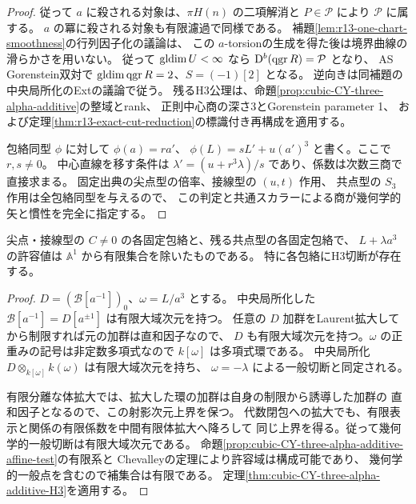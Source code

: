 \begin{proof}
従って $a$ に殺される対象は、$\pi H(n)$ の二項解消と
$P\in\mathcal P$ により $\mathcal P$ に属する。
$a$ の冪に殺される対象も有限濾過で同様である。
補題\ref{lem:r13-one-chart-smoothness}の行列因子化の議論は、
この $a$-torsionの生成を得た後は境界曲線の滑らかさを用いない。
従って $\operatorname{gldim} U<\infty$ なら $\mathrm D^b(\operatorname{qgr} R)=\mathcal P$ となり、
AS Gorenstein双対で $\operatorname{gldim}\operatorname{qgr} R=2$、$S=(-1)[2]$ となる。
逆向きは同補題の中央局所化のExtの議論で従う。
残るH3公理は、命題\ref{prop:cubic-CY-three-alpha-additive}の整域とrank、
正則中心商の深さ3とGorenstein parameter 1、
および定理\ref{thm:r13-exact-cut-reduction}の標識付き再構成を適用する。

包絡同型 $\phi$ に対して $\phi(a)=r a'$、
$\phi(L)=sL'+u(a')^3$ と書く。ここで $r,s\ne0$。
中心直線を移す条件は
$\lambda'=(u+r^3\lambda)/s$ であり、係数は次数三商で直接求まる。
固定出典の尖点型の倍率、接線型の $(u,t)$ 作用、
共点型の $S_3$ 作用は全包絡同型を与えるので、
この判定と共通スカラーによる商が幾何学的矢と慣性を完全に指定する。
\end{proof}

\begin{corollary}\label{cor:cubic-CY-three-alpha-additive-finite-exception}
尖点・接線型の $C\ne0$ の各固定包絡と、残る共点型の各固定包絡で、
$L+\lambda a^3$ の許容値は $\mathbb A^1$ から有限集合を除いたものである。
特に各包絡にH3切断が存在する。
\end{corollary}
\begin{proof}
$D=(\mathcal B[a^{-1}])_0$、$\omega=L/a^3$ とする。
中央局所化した $\mathcal B[a^{-1}]=D[a^{\pm1}]$ は有限大域次元を持つ。
任意の $D$ 加群をLaurent拡大してから制限すれば元の加群は直和因子なので、
$D$ も有限大域次元を持つ。$\omega$ の正重みの記号は非定数多項式なので
$k[\omega]$ は多項式環である。
中央局所化 $D\otimes_{k[\omega]}k(\omega)$ は有限大域次元を持ち、
$\omega=-\lambda$ による一般切断と同定される。

有限分離な体拡大では、拡大した環の加群は自身の制限から誘導した加群の
直和因子となるので、この射影次元上界を保つ。
代数閉包への拡大でも、有限表示と関係の有限係数を中間有限体拡大へ降ろして
同じ上界を得る。従って幾何学的一般切断は有限大域次元である。
命題\ref{prop:cubic-CY-three-alpha-additive-affine-test}の有限系と
Chevalleyの定理により許容域は構成可能であり、
幾何学的一般点を含むので補集合は有限である。
定理\ref{thm:cubic-CY-three-alpha-additive-H3}を適用する。
\end{proof}
